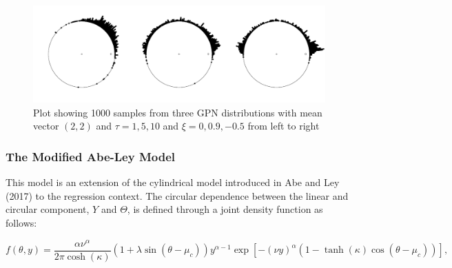 \documentclass[man,mask]{apa6}
\begin{document}
\begin{figure}
\centering
\includegraphics[width = \textwidth]{Plots/plotGPN.pdf}
\caption{Plot showing 1000 samples from three GPN distributions with mean vector $(2,2)$ and $\tau = 1,5,10$ and $\xi = 0, 0.9, -0.5$ from left to right}
\label{plotGPN}
\end{figure}

\subsubsection{The Modified Abe-Ley Model}\label{WeiSSVM}

This model is an extension of the cylindrical model introduced in
Abe and Ley (2017) to the regression context. The circular dependence between the
linear and circular component, \(Y\) and \(\Theta\), is defined through a joint
density function as follows:

\begin{equation}\label{WeiSSVMdensity}
f(\theta, y) = \frac{\alpha\nu^\alpha}{2\pi\cosh(\kappa)}
                 (1 +\lambda\sin(\theta - \mu_c))
                 y^{\alpha-1}
                 \exp[-(\nu y)^{\alpha}(1-\tanh(\kappa)\cos(\theta - \mu_c))],
\end{equation}
\end{document}
